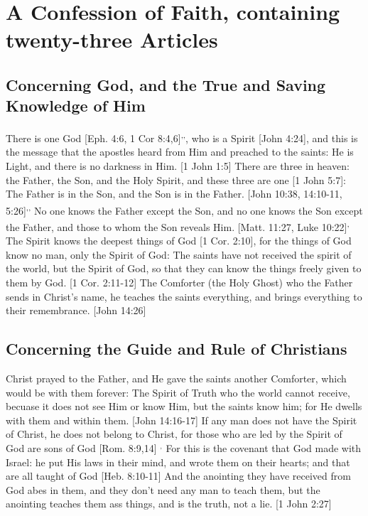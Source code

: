 \documentclass[../main.tex] {subfiles}
\begin{document}
	
	\chapter*{A Confession of Faith, containing twenty-three Articles}
	
	\section{Concerning God, and the True and Saving Knowledge of Him}

	There is one God [Eph. 4:6, 1 Cor 8:4,6]\textsuperscript{,}\textsuperscript{,}, who is a Spirit [John 4:24], and this is the message that the apostles heard from Him and preached to the saints: He is Light, and there is no darkness in Him. [1 John 1:5] There are three in heaven: the Father, the Son, and the Holy Spirit, and these three are one [1 John 5:7]: The Father is in the Son, and the Son is in the Father. [John 10:38, 14:10-11, 5:26]\textsuperscript{,}\textsuperscript{,} No one knows the Father except the Son, and no one knows the Son except the Father, and those to whom the Son reveals Him. [Matt. 11:27, Luke 10:22]\textsuperscript{,} The Spirit knows the deepest things of God [1 Cor. 2:10], for the things of God know no man, only the Spirit of God: The saints have not received the spirit of the world, but the Spirit of God, so that they can know the things freely given to them by God. [1 Cor. 2:11-12] The Comforter (the Holy Ghost) who the Father sends in Christ's name, he teaches the saints everything, and brings everything to their remembrance. [John 14:26] 

	\section{Concerning the Guide and Rule of Christians}

	Christ prayed to the Father, and He gave the saints another Comforter, which would be with them forever: The Spirit of Truth who the world cannot receive, becuase it does not see Him or know Him, but the saints know him; for He dwells with them and within them. [John 14:16-17]  If any man does not have the Spirit of Christ, he does not belong to Christ, for those who are led by the Spirit of God are sons of God [Rom. 8:9,14] $^{,}$ For this is the covenant that God made with Israel: he put His laws in their mind, and wrote them on their hearts; and that are all taught of God [Heb. 8:10-11]  And the anointing they have received from God abes in them, and they don't need any man to teach them, but the anointing teaches them ass things, and is the truth, not a lie. [1 John 2:27] 
\end{document}
